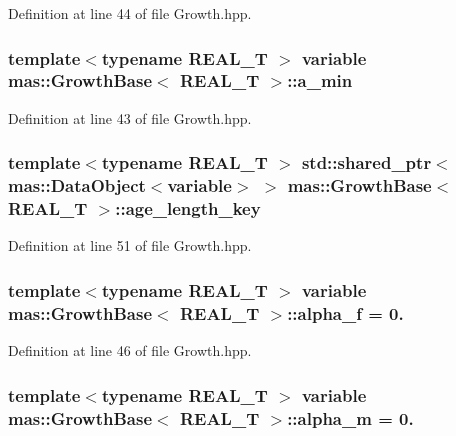 Definition at line 44 of file Growth.\-hpp.

\hypertarget{structmas_1_1_growth_base_aab84c98377a8d04e4dcaaa7e7e19d2e2}{
\subsubsection[{a\-\_\-min}]{\setlength{\rightskip}{0pt plus 5cm}template$<$typename R\-E\-A\-L\-\_\-\-T $>$ {\bf variable} {\bf mas\-::\-Growth\-Base}$<$ R\-E\-A\-L\-\_\-\-T $>$\-::a\-\_\-min}}\label{structmas_1_1_growth_base_aab84c98377a8d04e4dcaaa7e7e19d2e2}


Definition at line 43 of file Growth.\-hpp.

\hypertarget{structmas_1_1_growth_base_a8b31d8d43f6ec3383d3be31a674f997a}{
\subsubsection[{age\-\_\-length\-\_\-key}]{\setlength{\rightskip}{0pt plus 5cm}template$<$typename R\-E\-A\-L\-\_\-\-T $>$ std\-::shared\-\_\-ptr$<${\bf mas\-::\-Data\-Object}$<${\bf variable}$>$ $>$ {\bf mas\-::\-Growth\-Base}$<$ R\-E\-A\-L\-\_\-\-T $>$\-::age\-\_\-length\-\_\-key}}\label{structmas_1_1_growth_base_a8b31d8d43f6ec3383d3be31a674f997a}


Definition at line 51 of file Growth.\-hpp.

\hypertarget{structmas_1_1_growth_base_a412552f9b7d23d1c1f056e826b8981ae}{
\subsubsection[{alpha\-\_\-f}]{\setlength{\rightskip}{0pt plus 5cm}template$<$typename R\-E\-A\-L\-\_\-\-T $>$ {\bf variable} {\bf mas\-::\-Growth\-Base}$<$ R\-E\-A\-L\-\_\-\-T $>$\-::alpha\-\_\-f = 0.}}\label{structmas_1_1_growth_base_a412552f9b7d23d1c1f056e826b8981ae}


Definition at line 46 of file Growth.\-hpp.

\hypertarget{structmas_1_1_growth_base_a396354505138367e93a446571e934e9e}{
\subsubsection[{alpha\-\_\-m}]{\setlength{\rightskip}{0pt plus 5cm}template$<$typename R\-E\-A\-L\-\_\-\-T $>$ {\bf variable} {\bf mas\-::\-Growth\-Base}$<$ R\-E\-A\-L\-\_\-\-T $>$\-::alpha\-\_\-m = 0.}}\label{structmas_1_1_growth_base_a396354505138367e93a446571e934e9e}


